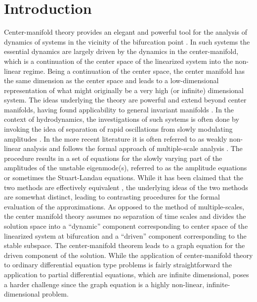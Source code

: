 \section{Introduction}

Center-manifold theory provides an elegant and powerful tool for the analysis of dynamics of systems in the vicinity of the bifurcation point \citep{carr82,carr83b,sijbrand85,guckenheimer83,wiggins03}. In such systems the essential dynamics are largely driven by the dynamics in the center-manifold, which is a continuation of the center space of the linearized system into the non-linear regime. Being a continuation of the center space, the center manifold has the same dimension as the center space and leads to a low-dimensional representation of what might originally be a very high (or infinite) dimensional system. The ideas underlying the theory are powerful and extend beyond center manifolds, having found applicability to general invariant manifolds \citep{roberts89}. In the context of hydrodynamics, the investigations of such systems is often done by invoking the idea of separation of rapid oscillations from slowly modulating amplitudes \citep{stuart60,watson60,newell69}. In the more recent literature it is often referred to as weakly non-linear analysis and follows the formal approach of multiple-scale analysis \citep{sipp07,meliga11,meliga12}. The procedure results in a set of equations for the slowly varying part of the amplitudes of the unstable eigenmode(s), referred to as the amplitude equations \citep{cross09} or sometimes the Stuart-Landau equations. While it has been claimed that the two methods are effectively equivalent \citep{fujimara91}, the underlying ideas of the two methods are somewhat distinct, leading to contrasting procedures for the formal evaluation of the approximations. As opposed to the method of multiple-scales, the center manifold theory assumes no separation of time scales and divides the solution space into a ``dynamic'' component corresponding to center space of the linearized system at bifurcation and a ``driven'' component corresponding to the stable subspace. The center-manifold theorem leads to a graph equation for the driven component of the solution. While the application of center-manifold theory to ordinary differential equation type problems is fairly straightforward the application to partial differential equations, which are infinite dimensional, poses a harder challenge since the graph equation is a highly non-linear, infinite-dimensional problem. 

